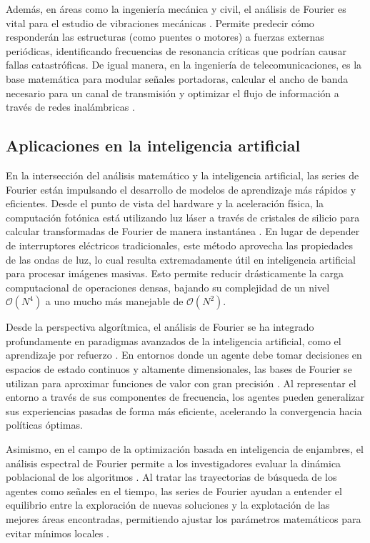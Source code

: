 Además, en áreas como la ingeniería mecánica y civil, el análisis de Fourier es vital para el estudio de vibraciones mecánicas \cite{rao:vibraciones:2016}. Permite predecir cómo responderán las estructuras (como puentes o motores) a fuerzas externas periódicas, identificando frecuencias de resonancia críticas que podrían causar fallas catastróficas. De igual manera, en la ingeniería de telecomunicaciones, es la base matemática para modular señales portadoras, calcular el ancho de banda necesario para un canal de transmisión y optimizar el flujo de información a través de redes inalámbricas \cite{oppenheim:dsp:2009}.

\subsection{Aplicaciones en la inteligencia artificial}
\label{sec:cap01:marco-teorico:ia}

En la intersección del análisis matemático y la inteligencia artificial, las series de Fourier están impulsando el desarrollo de modelos de aprendizaje más rápidos y eficientes. Desde el punto de vista del hardware y la aceleración física, la computación fotónica está utilizando luz láser a través de cristales de silicio para calcular transformadas de Fourier de manera instantánea \cite{zhang:photonic-fourier:2023}. En lugar de depender de interruptores eléctricos tradicionales, este método aprovecha las propiedades de las ondas de luz, lo cual resulta extremadamente útil en inteligencia artificial para procesar imágenes masivas. Esto permite reducir drásticamente la carga computacional de operaciones densas, bajando su complejidad de un nivel $\mathcal{O}(N^{4})$ a uno mucho más manejable de $\mathcal{O}(N^{2})$.

Desde la perspectiva algorítmica, el análisis de Fourier se ha integrado profundamente en paradigmas avanzados de la inteligencia artificial, como el aprendizaje por refuerzo \cite{konidaris:fourier-basis-rl:2011}. En entornos donde un agente debe tomar decisiones en espacios de estado continuos y altamente dimensionales, las bases de Fourier se utilizan para aproximar funciones de valor con gran precisión \cite{konidaris:fourier-basis-rl:2011}. Al representar el entorno a través de sus componentes de frecuencia, los agentes pueden generalizar sus experiencias pasadas de forma más eficiente, acelerando la convergencia hacia políticas óptimas.

Asimismo, en el campo de la optimización basada en inteligencia de enjambres, el análisis espectral de Fourier permite a los investigadores evaluar la dinámica poblacional de los algoritmos \cite{clerc:pso-convergencia:2002}. Al tratar las trayectorias de búsqueda de los agentes como señales en el tiempo, las series de Fourier ayudan a entender el equilibrio entre la exploración de nuevas soluciones y la explotación de las mejores áreas encontradas, permitiendo ajustar los parámetros matemáticos para evitar mínimos locales \cite{clerc:pso-convergencia:2002}.

